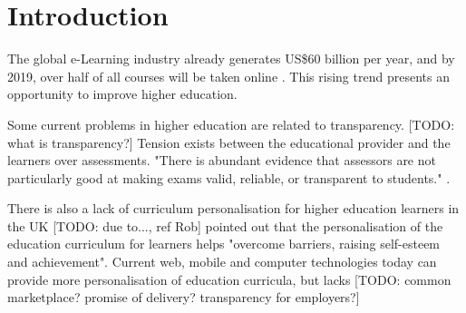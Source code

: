 
\chapter{Introduction}  %



The global e-Learning industry already generates US\$60 billion per year, and by 2019, over half of all courses will be taken 
online \citep[p.17]{panto2013challenge}. This rising trend presents an opportunity to improve higher education.

Some current problems in higher education are related to transparency. [TODO: what is transparency?] Tension exists between 
the educational provider and the learners over assessments. "There is abundant evidence that assessors are not particularly 
good at making exams valid, reliable, or transparent to students." \citep[p.62]{brown1999assessment}.


There is also a lack of curriculum personalisation for higher education learners in the UK [TODO: due to..., ref Rob] 
\citet{condie2007impact} pointed out that the personalisation of the education curriculum for learners helps "overcome 
barriers, raising self-esteem and achievement". 
Current web, mobile and computer technologies today can provide more personalisation of education curricula, but lacks
[TODO: common marketplace? promise of delivery? transparency for employers?]

